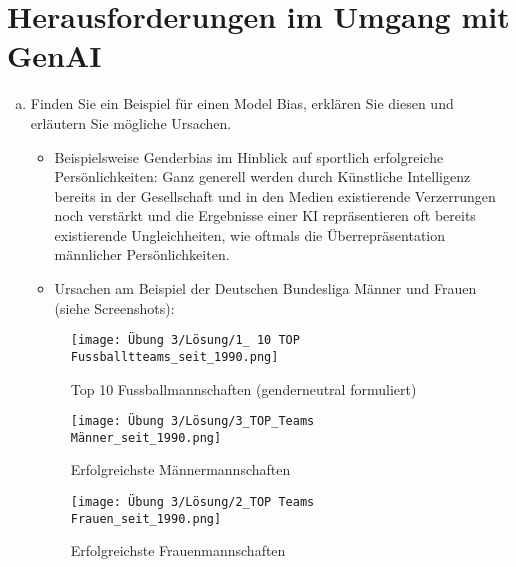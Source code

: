 \documentclass[12pt,ngerman]{AssignmentClass}
\begin{document}
    
    \section{Herausforderungen im Umgang mit GenAI}
        \begin{enumerate}[a)]
            \item Finden Sie ein Beispiel für einen Model Bias, erklären Sie diesen und erläutern Sie mögliche Ursachen.

                \begin{itemize}
                    \item Beispielsweise Genderbias im Hinblick auf sportlich erfolgreiche Persönlichkeiten: Ganz generell werden durch Künstliche Intelligenz bereits in der Gesellschaft und in den Medien existierende Verzerrungen noch verstärkt und die Ergebnisse einer KI repräsentieren oft bereits existierende Ungleichheiten, wie oftmals die Überrepräsentation männlicher Persönlichkeiten.
                    \item Ursachen am Beispiel der Deutschen Bundesliga Männer und Frauen (siehe Screenshots):
                \end{itemize}
    
                \begin{figure}
                    \centering
                    \texttt{[image: Übung 3/Lösung/1\_ 10 TOP Fussballtteams\_seit\_1990.png]}
                    \caption{Top 10 Fussballmannschaften (genderneutral formuliert)}
                    \label{fig:top-teams}
                \end{figure}
    
                \begin{figure}
                    \centering
                    \texttt{[image: Übung 3/Lösung/3\_TOP\_Teams Männer\_seit\_1990.png]}
                    \caption{Erfolgreichste Männermannschaften}
                    \label{fig:top-maenner}
                \end{figure}
    
                \begin{figure}
                    \centering
                    \texttt{[image: Übung 3/Lösung/2\_TOP Teams Frauen\_seit\_1990.png]}
                    \caption{Erfolgreichste Frauenmannschaften}
                    \label{fig:top-frauen}
                \end{figure}
    

\end{enumerate}
\end{document}
